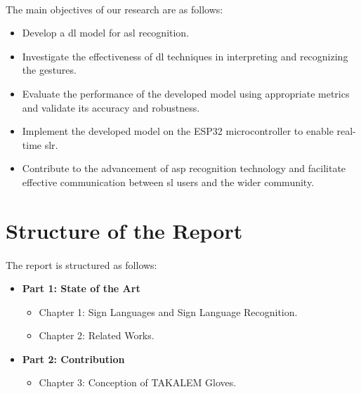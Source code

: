 \paragraph{}
The main objectives of our research are as follows:
\begin{itemize}
	\item Develop a \ac{dl} model for \ac{asl} recognition.
	\item Investigate the effectiveness of \ac{dl} techniques in interpreting and recognizing the gestures.
	\item Evaluate the performance of the developed model using appropriate metrics and validate its accuracy and robustness.
	\item Implement the developed model on the ESP32 microcontroller to enable real-time \ac{slr}.
	\item Contribute to the advancement of \ac{asp} recognition technology and facilitate effective communication between \ac{sl} users and the wider community.
\end{itemize}

\section*{Structure of the Report}
\paragraph{}
The report is structured as follows:

\begin{itemize}
	\item \textbf{Part 1: State of the Art}
	\begin{itemize}
		\item Chapter 1: Sign Languages and Sign Language Recognition.
		\item Chapter 2: Related Works.
	\end{itemize}
	
	\item \textbf{Part 2: Contribution}
	\begin{itemize}
		\item Chapter 3: Conception of TAKALEM Gloves.
	\end{itemize}
\end{itemize}